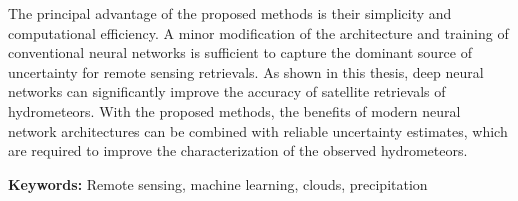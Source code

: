 The principal advantage of the proposed methods is their simplicity and
computational efficiency. A minor modification of the architecture and training
of conventional neural networks is sufficient to capture the dominant source of
uncertainty for remote sensing retrievals. As shown in this thesis, deep neural
networks can significantly improve the accuracy of satellite retrievals of
hydrometeors. With the proposed methods, the benefits of modern neural network
architectures can be combined with reliable uncertainty estimates, which are
required to improve the characterization of the observed hydrometeors.

\vfill
{\textbf{Keywords:} Remote sensing, machine learning, clouds, precipitation}



